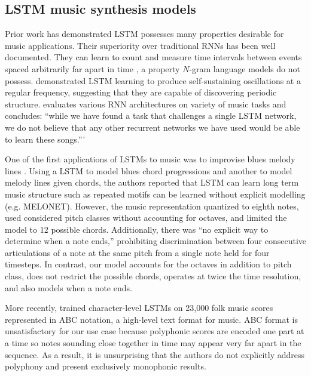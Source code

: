 \subsection{LSTM music synthesis models}

Prior work has demonstrated LSTM possesses many properties desirable for music
applications. Their superiority over traditional RNNs has been well
documented\citep{gers2001lstm}. They can learn to count and measure time
intervals between events spaced arbitrarily far apart in time
\citep{gers2000recurrent}, a property $N$-gram language models do not possess.
\citep{gers2002learning} demonstrated LSTM learning to produce self-sustaining
oscillations at a regular frequency, suggesting that they are capable of
discovering periodic structure. \citep{franklin2006recurrent} evaluates various
RNN architectures on variety of music tasks and concludes: ``while we have
found a task that challenges a single LSTM network, we do not believe that any
other recurrent networks we have used would be able to learn these songs.'''

One of the first applications of LSTMs to music was to improvise blues melody
lines \citep{Eck2002}\cite{Eck2002-blues}. Using a LSTM to model blues chord
progressions and another to model melody lines given chords, the authors
reported that LSTM can learn long term music structure such as repeated motifs
can be learned without explicit modelling (e.g. MELONET). However, the music
representation quantized to eighth notes, used considered pitch classes without
accounting for octaves, and limited the model to $12$ possible chords.
Additionally, there was ``no explicit way to determine when a note ends,''
prohibiting discrimination between four consecutive articulations of a note at
the same pitch from a single note held for four timesteps. In contrast, our
model accounts for the octaves in addition to pitch class, does not restrict
the possible chords, operates at twice the time resolution, and also
models when a note ends.

More recently, \citep{sturm2015folk} \cite{sturm2016music} trained
character-level LSTMs on 23,000 folk music scores represented in ABC
notation\citep{abcstandard}, a high-level text format for music. ABC format is
unsatisfactory for our use case because polyphonic scores are encoded one part
at a time so notes sounding close together in time may appear very far apart in
the sequence. As a result, it is unsurprising that the authors do not
explicitly address polyphony and present exclusively monophonic results.

